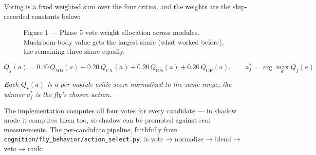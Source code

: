 \documentclass[11pt]{article}
\begin{document}
Voting is a fixed weighted sum over the four critics, and the weights are the ship-recorded constants below:

\begin{figure}[htbp]
\centering
{}
\caption*{Figure 1 — Phase 5 vote-weight allocation across modules. Mushroom-body value gets the largest share (what worked before), the remaining three share equally.}
\end{figure}

\begin{equation}
Q_f(a) = 0.40\,Q_{\mathrm{MB}}(a) + 0.20\,Q_{\mathrm{CX}}(a) + 0.20\,Q_{\mathrm{DN}}(a) + 0.20\,Q_{\mathrm{GF}}(a),\qquad a_f^* = \arg\max_a Q_f(a)
\tag{1}
\end{equation}

\noindent\emph{Each \(Q_\star(a)\) is a per-module critic score normalized to the same range; the winner \(a_f^*\) is the fly's chosen action.}

The implementation computes all four votes for every candidate — in shadow mode it computes them too, so shadow can be promoted against real measurements. The per-candidate pipeline, faithfully from \texttt{cognition/fly\_behavior/action\_select.py}, is vote → normalize → blend → veto → rank:
\end{document}
